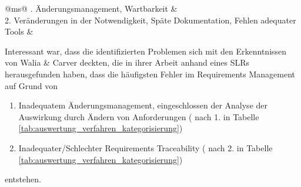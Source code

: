 \begin{table}[!ht]
\renewcommand{\arraystretch}{1.3}
\caption{Motivationen für Probleme}
\label{tab:auswertung_probleme_motivation}
\centering
\begin{tabularx}{\columnwidth}{@{}ms@{}}
. Änderungsmanagement, Wartbarkeit & \cite{Saputri2016EnsuringApproach,Bavota2014EnhancingInformation,Spanoudakis2004Rule-basedRelations, Javed2014ACode,Tsuchiya2015InteractiveLogs,Omoronyia2011ExploringTraceability, Lago2009AManagement, Mader2009EnablingRelations, Mder2012TowardsMaintenance, Ghabi2015ExploitingCode} \\
2. Veränderungen in der Notwendigkeit, Späte Dokumentation, Fehlen adequater Tools & \cite{Mder2007CustomizingProcess, Leuser2010TacklingSpecifications, Merten2016DoData} \\
\bottomrule
\end{tabularx} 
\end{table}

Interessant war, dass die identifizierten Problemen sich mit den Erkenntnissen von Walia \& Carver \cite{Walia2009AErrors} deckten, die in ihrer Arbeit anhand eines SLRs herausgefunden haben, dass die häufigsten Fehler im Requirements Management auf Grund von

\begin{enumerate}
    \item Inadequatem Änderungsmanagement, eingeschlossen der Analyse der Auswirkung durch Ändern von Anforderungen ( nach 1. in Tabelle \ref{tab:auswertung_verfahren_kategorisierung})
    \item Inadequater/Schlechter Requirements Traceability ( nach 2. in Tabelle \ref{tab:auswertung_verfahren_kategorisierung})
\end{enumerate}

entstehen. \cite{Walia2009AErrors}


